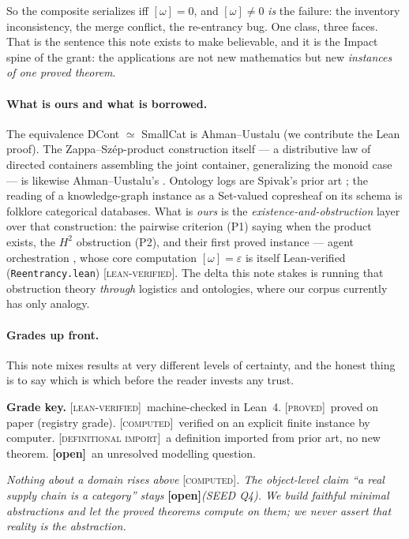 \documentclass[11pt]{article}
\theoremstyle{definition}
\newcommand{\gLean}{\textsc{[lean-verified]}}
\newcommand{\gProved}{\textsc{[proved]}}
\newcommand{\gComputed}{\textsc{[computed]}}
\newcommand{\gImport}{\textsc{[definitional import]}}
\newcommand{\gOpen}{\textbf{[open]}}
\begin{document}
So the composite serializes iff $[\omega]=0$, and $[\omega]\neq 0$ \emph{is} the failure:
the inventory inconsistency, the merge conflict, the re-entrancy bug. One class, three
faces. That is the sentence this note exists to make believable, and it is the Impact
spine of the grant: the applications are not new mathematics but new \emph{instances of
one proved theorem}.

\paragraph{What is ours and what is borrowed.} The equivalence DCont $\simeq$ SmallCat is
Ahman--Uustalu \cite{au-dccat} (we contribute the Lean proof). The Zappa--Sz\'ep-product
construction itself --- a distributive law of directed containers assembling the joint
container, generalizing the monoid case --- is likewise Ahman--Uustalu's \cite{au-distlaw}.
Ontology logs are Spivak's
prior art \cite{spivak-ologs}; the reading of a knowledge-graph instance as a Set-valued
copresheaf on its schema is folklore categorical databases. What is \emph{ours} is the
\emph{existence-and-obstruction} layer over that construction: the pairwise criterion (P1)
saying when the product exists, the $H^2$ obstruction (P2), and their
first proved instance --- agent orchestration \cite{orch}, whose core computation
$[\omega]=\varepsilon$ is itself Lean-verified (\texttt{Reentrancy.lean}) \gLean. The delta
this note stakes is running that obstruction theory \emph{through} logistics and ontologies,
where our corpus currently has only analogy.

\paragraph{Grades up front.} This note mixes results at very different levels of certainty,
and the honest thing is to say which is which before the reader invests any trust.

\begin{mdframed}
\textbf{Grade key.} \gLean\ machine-checked in Lean~4. \gProved\ proved on paper (registry
grade). \gComputed\ verified on an explicit finite instance by computer. \gImport\ a
definition imported from prior art, no new theorem. \gOpen\ an unresolved modelling
question.

\smallskip
\noindent\emph{Nothing about a domain rises above} \gComputed\emph{. The object-level claim
``a real supply chain \emph{is} a category'' stays} \gOpen \emph{(SEED Q4). We build
faithful minimal abstractions and let the proved theorems compute on them; we never assert
that reality is the abstraction.}
\end{mdframed}
\end{document}
